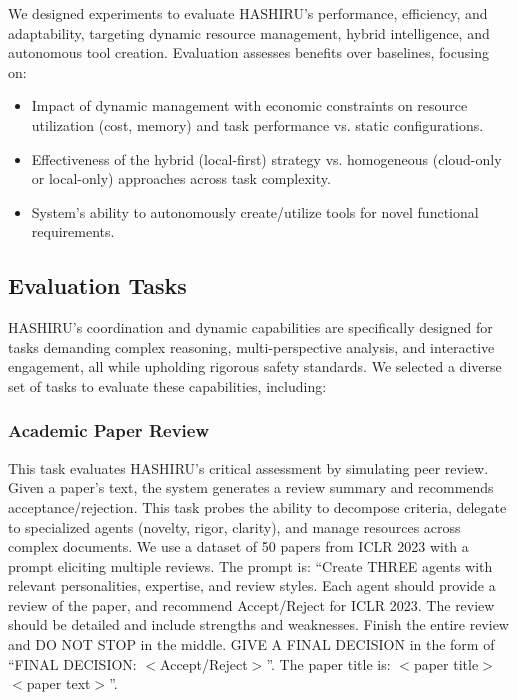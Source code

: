 \documentclass[conference]{IEEEtran}
\begin{document}
We designed experiments to evaluate HASHIRU's performance, efficiency, and adaptability, targeting dynamic resource management, hybrid intelligence, and autonomous tool creation. Evaluation assesses benefits over baselines, focusing on:
\begin{itemize}
    \item Impact of dynamic management with economic constraints on resource utilization (cost, memory) and task performance vs. static configurations.
    \item Effectiveness of the hybrid (local-first) strategy vs. homogeneous (cloud-only or local-only) approaches across task complexity.
    \item System's ability to autonomously create/utilize tools for novel functional requirements.
\end{itemize}

\subsection{Evaluation Tasks}
\label{subsec:tasks}
HASHIRU's coordination and dynamic capabilities are specifically designed for tasks demanding complex reasoning, multi-perspective analysis, and interactive engagement, all while upholding rigorous safety standards. We selected a diverse set of tasks to evaluate these capabilities, including:

\subsubsection{Academic Paper Review}
This task evaluates HASHIRU's critical assessment by simulating peer review. Given a paper's text, the system generates a review summary and recommends acceptance/rejection. This task probes the ability to decompose criteria, delegate to specialized agents (novelty, rigor, clarity), and manage resources across complex documents.
We use a dataset of 50 papers from ICLR 2023 with a prompt eliciting multiple reviews. The prompt is: ``Create THREE agents with relevant personalities, expertise, and review styles. Each agent should provide a review of the paper, and recommend Accept/Reject for ICLR 2023. The review should be detailed and include strengths and weaknesses. Finish the entire review and DO NOT STOP in the middle. GIVE A FINAL DECISION in the form of ``FINAL DECISION: $<$Accept/Reject$>$''. The paper title is: $<$paper title$>$ $<$paper text$>$''.
\end{document}
